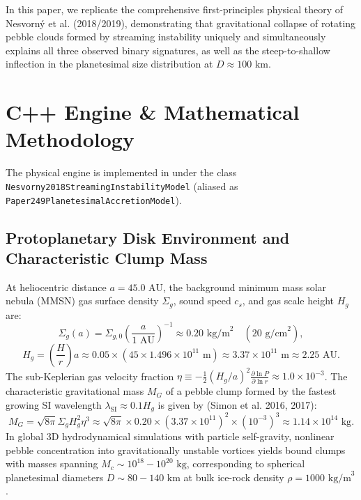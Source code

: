 \documentclass[11pt,a4paper]{article}
\begin{document}
In this paper, we replicate the comprehensive first-principles physical theory of Nesvorn\'y et al. (2018/2019), demonstrating that gravitational collapse of rotating pebble clouds formed by streaming instability uniquely and simultaneously explains all three observed binary signatures, as well as the steep-to-shallow inflection in the planetesimal size distribution at $D \approx 100\text{ km}$.

\section{C++ Engine \& Mathematical Methodology}
The physical engine is implemented in  under the class \linebreak \texttt{Nesvorny2018StreamingInstabilityModel} (aliased as \texttt{Paper249PlanetesimalAccretionModel}).

\subsection{Protoplanetary Disk Environment and Characteristic Clump Mass}
At heliocentric distance $a = 45.0\text{ AU}$, the background minimum mass solar nebula (MMSN) gas surface density $\Sigma_g$, sound speed $c_s$, and gas scale height $H_g$ are:
\begin{equation}
\Sigma_g(a) = \Sigma_{g,0} \left(\frac{a}{1\text{ AU}}\right)^{-1} \approx 0.20\text{ kg/m}^2 \quad (20\text{ g/cm}^2),
\end{equation}
\begin{equation}
H_g = \left(\frac{H}{r}\right) a \approx 0.05 \times (45 \times 1.496 \times 10^{11}\text{ m}) \approx 3.37 \times 10^{11}\text{ m} \approx 2.25\text{ AU}.
\end{equation}
The sub-Keplerian gas velocity fraction $\eta \equiv -\frac{1}{2} (H_g / a)^2 \frac{\partial \ln P}{\partial \ln r} \approx 1.0 \times 10^{-3}$. The characteristic gravitational mass $M_G$ of a pebble clump formed by the fastest growing SI wavelength $\lambda_{\text{SI}} \approx 0.1 H_g$ is given by (Simon et al. 2016, 2017):
\begin{equation}
M_G = \sqrt{8\pi} \Sigma_g H_g^2 \eta^3 \approx \sqrt{8\pi} \times 0.20 \times (3.37 \times 10^{11})^2 \times (10^{-3})^3 \approx 1.14 \times 10^{14}\text{ kg}.
\end{equation}
In global 3D hydrodynamical simulations with particle self-gravity, nonlinear pebble concentration into gravitationally unstable vortices yields bound clumps with masses spanning $M_c \sim 10^{18} - 10^{20}\text{ kg}$, corresponding to spherical planetesimal diameters $D \sim 80 - 140\text{ km}$ at bulk ice-rock density $\rho = 1000\text{ kg/m}^3$.
\end{document}
